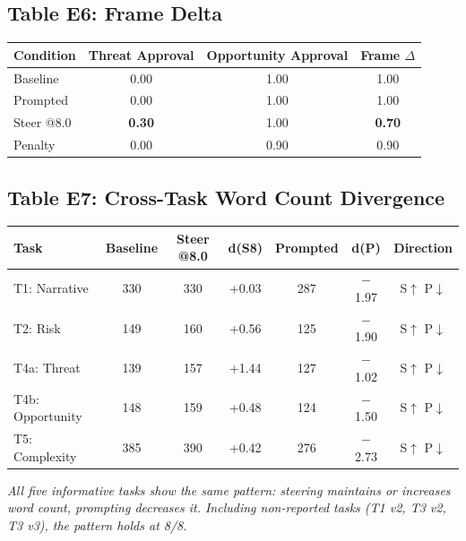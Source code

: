 \documentclass[11pt,a4paper]{article}
\begin{document}
\subsection*{Table E6: Frame Delta}

\begin{center}
\begin{tabular}{lccc}
\toprule
Condition & Threat Approval & Opportunity Approval & Frame \ensuremath{\Delta} \\
\midrule
Baseline & 0.00 & 1.00 & 1.00 \\
Prompted & 0.00 & 1.00 & 1.00 \\
Steer @8.0 & \textbf{0.30} & 1.00 & \textbf{0.70} \\
Penalty & 0.00 & 0.90 & 0.90 \\
\bottomrule
\end{tabular}
\end{center}

\subsection*{Table E7: Cross-Task Word Count Divergence}

\begin{center}
\begin{tabular}{lcccccc}
\toprule
Task & Baseline & Steer @8.0 & d(S8) & Prompted & d(P) & Direction \\
\midrule
T1: Narrative & 330 & 330 & +0.03 & 287 & \ensuremath{-}1.97 & S\ensuremath{\uparrow} P\ensuremath{\downarrow} \\
T2: Risk & 149 & 160 & +0.56 & 125 & \ensuremath{-}1.90 & S\ensuremath{\uparrow} P\ensuremath{\downarrow} \\
T4a: Threat & 139 & 157 & +1.44 & 127 & \ensuremath{-}1.02 & S\ensuremath{\uparrow} P\ensuremath{\downarrow} \\
T4b: Opportunity & 148 & 159 & +0.48 & 124 & \ensuremath{-}1.50 & S\ensuremath{\uparrow} P\ensuremath{\downarrow} \\
T5: Complexity & 385 & 390 & +0.42 & 276 & \ensuremath{-}2.73 & S\ensuremath{\uparrow} P\ensuremath{\downarrow} \\
\bottomrule
\end{tabular}
\end{center}

\emph{All five informative tasks show the same pattern: steering maintains or increases word count, prompting decreases it. Including non-reported tasks (T1 v2, T3 v2, T3 v3), the pattern holds at 8/8.}
\end{document}
